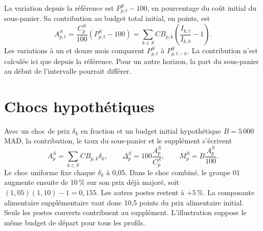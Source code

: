 La variation depuis la référence est $P_{p,t}^S-100$, en pourcentage du coût initial du sous-panier. Sa contribution au budget total initial, en points, est
\[
 A_{p,t}^S=\frac{C_p^S}{100}(P_{p,t}^S-100)
     =\sum_{k\in S}CB_{p,k}\left(\frac{I_{k,t}}{I_{k,b}}-1\right).
\]
Les variations à un et douze mois comparent $P_{p,t}^S$ à $P_{p,t-h}^S$. La contribution n'est calculée ici que depuis la référence. Pour un autre horizon, la part du sous-panier au début de l'intervalle pourrait différer.

\section{Chocs hypothétiques}
Avec un choc de prix $\delta_k$ en fraction et un budget initial hypothétique $B=5\,000$ MAD, la contribution, le taux du sous-panier et le supplément s'écrivent
\[
 A_p^S=\sum_{k\in S}CB_{p,k}\delta_k,\qquad
 \Delta_p^S=100\frac{A_p^S}{C_p^S},\qquad
 M_p^S=B\frac{A_p^S}{100}.
\]
Le choc uniforme fixe chaque $\delta_k$ à 0,05. Dans le choc combiné, le groupe 01 augmente ensuite de 10\,\% sur son prix déjà majoré, soit $(1{,}05)(1{,}10)-1=0{,}155$. Les autres postes restent à +5\,\%. La composante alimentaire supplémentaire vaut donc 10,5 points du prix alimentaire initial. Seuls les postes couverts contribuent au supplément. L'illustration suppose le même budget de départ pour tous les profils.
